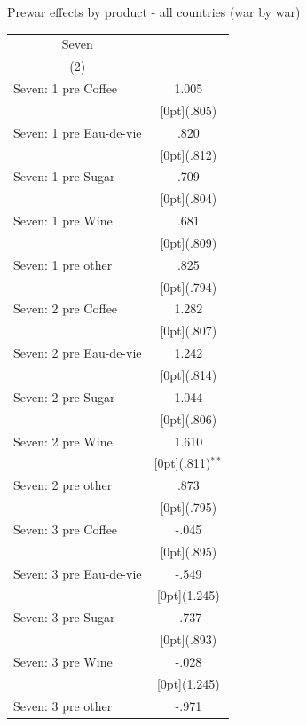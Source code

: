 \documentclass[12pt,a4paper,titlepage]{article}
\begin{document}
{\newpage
\caption{Prewar effects by product - all countries (war by war)}
\begin{tabular*}{\textwidth}{@{\extracolsep{\fill}}lc}	
	\multicolumn{1}{c}{Seven} \\
\cline{2-2}	
	\multicolumn{1}{c}{(2)} \\
\hline	
Seven: 1 pre Coffee &	1.005 \\
&	\raisebox{.7ex}[0pt]{\scriptsize (.805)} \\
Seven: 1 pre Eau-de-vie &	.820 \\
&	\raisebox{.7ex}[0pt]{\scriptsize (.812)} \\
Seven: 1 pre Sugar &	.709 \\
&	\raisebox{.7ex}[0pt]{\scriptsize (.804)} \\
Seven: 1 pre Wine &	.681 \\
&	\raisebox{.7ex}[0pt]{\scriptsize (.809)} \\
Seven: 1 pre other &	.825 \\
&	\raisebox{.7ex}[0pt]{\scriptsize (.794)} \\
Seven: 2 pre Coffee &	1.282 \\
&	\raisebox{.7ex}[0pt]{\scriptsize (.807)} \\
Seven: 2 pre Eau-de-vie &	1.242 \\
&	\raisebox{.7ex}[0pt]{\scriptsize (.814)} \\
Seven: 2 pre Sugar &	1.044 \\
&	\raisebox{.7ex}[0pt]{\scriptsize (.806)} \\
Seven: 2 pre Wine &	1.610 \\
&	\raisebox{.7ex}[0pt]{\scriptsize (.811)$^{**}$} \\
Seven: 2 pre other &	.873 \\
&	\raisebox{.7ex}[0pt]{\scriptsize (.795)} \\
Seven: 3 pre Coffee &	-.045 \\
&	\raisebox{.7ex}[0pt]{\scriptsize (.895)} \\
Seven: 3 pre Eau-de-vie &	-.549 \\
&	\raisebox{.7ex}[0pt]{\scriptsize (1.245)} \\
Seven: 3 pre Sugar &	-.737 \\
&	\raisebox{.7ex}[0pt]{\scriptsize (.893)} \\
Seven: 3 pre Wine &	-.028 \\
&	\raisebox{.7ex}[0pt]{\scriptsize (1.245)} \\
Seven: 3 pre other &	-.971 \\

\end{tabular*}}
\end{document}
